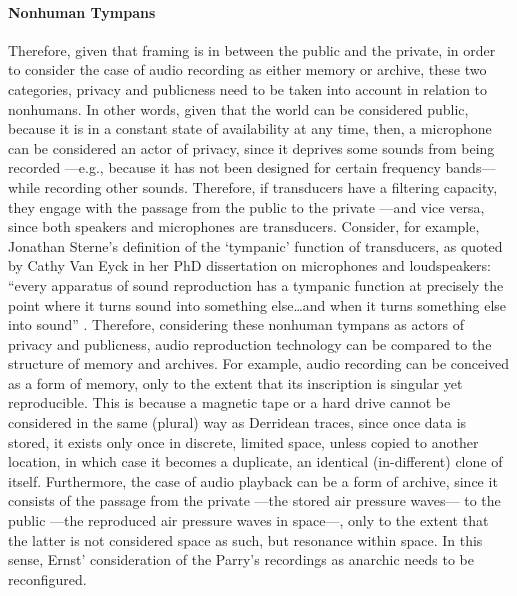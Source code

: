 \paragraph{Nonhuman Tympans}
Therefore, given that framing is in between the public and the private, in order to consider the case of audio recording as either memory or archive, these two categories, privacy and publicness need to be taken into account in relation to nonhumans. In other words, given that the world can be considered public, because it is in a constant state of availability at any time, then, a microphone can be considered an actor of privacy, since it deprives some sounds from being recorded ---e.g., because it has not been designed for certain frequency bands--- while recording other sounds. Therefore, if transducers have a filtering capacity, they engage with the passage from the public to the private ---and vice versa, since both speakers and microphones are transducers. Consider, for example, Jonathan Sterne's definition of the `tympanic' function of transducers, as quoted by Cathy Van Eyck in her PhD dissertation on microphones and loudspeakers: ``every apparatus of sound reproduction has a tympanic function at precisely the point where it turns sound into something else\dots and when it turns something else into sound'' \parencite[107]{Eck13:Bet}. Therefore, considering these nonhuman tympans as actors of privacy and publicness, audio reproduction technology can be compared to the structure of memory and archives. For example, audio recording can be conceived as a form of memory, only to the extent that its inscription is singular yet reproducible. This is because a magnetic tape or a hard drive cannot be considered in the same (plural) way as Derridean traces, since once data is stored, it exists only once in discrete, limited space, unless copied to another location, in which case it becomes a duplicate, an identical (in-different) clone of itself. Furthermore, the case of audio playback can be a form of archive, since it consists of the passage from the private ---the stored air pressure waves--- to the public ---the reproduced air pressure waves in space---, only to the extent that the latter is not considered space as such, but resonance within space. In this sense, Ernst' consideration of the Parry's recordings as anarchic needs to be reconfigured.

